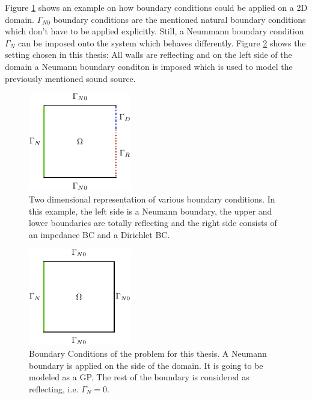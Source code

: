 \documentclass[%
  a4paper,oneside,%
  11pt,%
  smallchapters,
  style=printdev,
  extramargin,
  green,%
  rgb, <cmyk>
  ]{tubsbook}
\begin{document}
Figure \ref{fig:BCEx} shows an example on how boundary conditions could be applied on a 2D domain. $\Gamma_{N0}$ boundary conditions are the mentioned natural boundary conditions which don't have to be applied explicitly. Still, a Neummann boundary condition $\Gamma_{N}$ can be imposed onto the system which behaves differently. 
Figure \ref{fig:BCTh} shows the setting chosen in this thesis: All walls are reflecting and on the left side of the domain a Neumann boundary conditon is imposed which is used to model the previously mentioned sound source. 


\begin{figure}[!ht]
\begin{center}
\includegraphics[width=0.4\textwidth]{pics/BCsExample}
\caption{Two dimensional representation of various boundary conditions. In this example, the left side is a Neumann boundary, the upper and lower boundaries are totally reflecting and the right side consists of an impedance BC and a Dirichlet BC.}
\label{fig:BCEx}
\end{center}
\end{figure}


\begin{figure}[!ht]
\begin{center}
\includegraphics[width=0.4\textwidth]{pics/BCsThesis1}
\caption{Boundary Conditions of the problem for this thesis. A Neumann boundary is applied on the side of the domain. It is going to be modeled as a GP. The rest of the boundary is considered as reflecting, i.e. $\Gamma_N = 0$.}
\label{fig:BCTh}
\end{center}
\end{figure}
\end{document}
